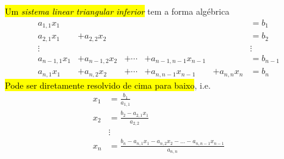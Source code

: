\hl{Um \emph{sistema linear triangular inferior}} tem a forma algébrica
\begin{equation}
  \begin{matrix}
    a_{1,1}x_1 &&&&&= b_1\\
    a_{2,1}x_1 &+ a_{2,2}x_2 &&&&= b_2\\
    \vdots &&&&& \vdots\\
    a_{n-1,1}x_1 &+ a_{n-1,2}x_2 &+ \cdots &+ a_{n-1,n-1}x_{n-1} &&= b_{n-1}\\
    a_{n,1}x_1 &+ a_{n,2}x_2 &+ \cdots &+ a_{n,n-1}x_{n-1} &+ a_{n,n}x_n &= b_n
  \end{matrix}
\end{equation}
\hl{Pode ser diretamente resolvido de cima para baixo}, i.e.
\begin{align}
  x_1 &= \frac{b_1}{a_{1,1}}\\
  x_2 &= \frac{b_{2} - a_{2,1}x_1}{a_{2,2}}\\
      &\vdots\\
  x_n &= \frac{b_n - a_{n,1}x_1 - a_{n,2}x_2 - \ldots - a_{n,n-1}x_{n-1}}{a_{n,n}}
\end{align}

